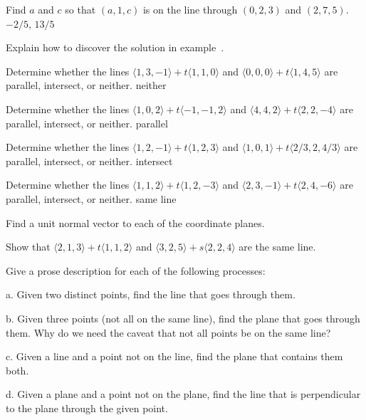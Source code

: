 \exercise Find $a$ and $c$ so that $(a,1,c)$ is on the line through
$(0,2,3)$ and $(2,7,5)$.
\answer $-2/5$, $13/5$
\endanswer
\endexercise

\exercise Explain how to discover the solution in
example~.
\endexercise

\exercise Determine whether the lines $\langle 1,3,-1\rangle+t\langle
1,1,0\rangle$ and $\langle 0,0,0\rangle+t\langle 1,4,5\rangle$ are
parallel, intersect, or neither.
\answer neither
\endanswer
\endexercise

\exercise Determine whether the lines $\langle 1,0,2\rangle+t\langle
-1,-1,2\rangle$ and $\langle 4,4,2\rangle+t\langle 2,2,-4\rangle$ are
parallel, intersect, or neither.
\answer parallel
\endanswer
\endexercise

\exercise Determine whether the lines $\langle 1,2,-1\rangle+t\langle
1,2,3\rangle$ and $\langle 1,0,1\rangle+t\langle 2/3,2,4/3\rangle$ are
parallel, intersect, or neither.
\answer intersect
\endanswer
\endexercise

\exercise Determine whether the lines $\langle 1,1,2\rangle+t\langle
1,2,-3\rangle$ and $\langle 2,3,-1\rangle+t\langle 2,4,-6\rangle$ are
parallel, intersect, or neither.
\answer same line
\endanswer
\endexercise

\exercise Find a unit normal vector to each of the coordinate planes.
\endexercise

\exercise Show that $\langle 2,1,3 \rangle + t \langle 1,1,2 \rangle$ and
$\langle 3, 2, 5 \rangle + s \langle 2, 2, 4 \rangle$ are the same
line.
\endexercise

\exercise Give a prose description for each of the following processes:

\beginlist

\item{a.} Given two distinct points, find the line that goes through them.

\item{b.} Given three points (not all on the same line), find the plane
  that goes through them. Why do we need the caveat that not all
  points be on the same line?

\item{c.} Given a line and a point not on the line, find the plane that
contains them both.

\item{d.} Given a plane and a point not on the plane, find the line that
is perpendicular to the plane through the given point.


